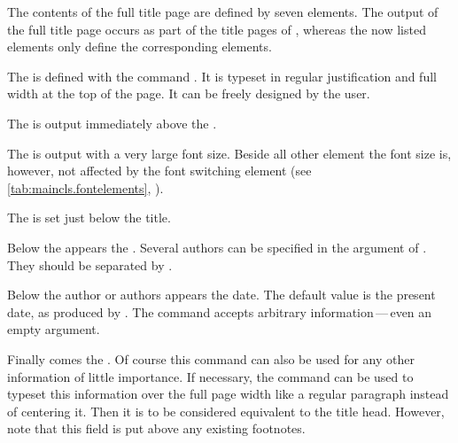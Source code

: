 \begin{Declaration}
\end{Declaration}%
The contents of the full title page are defined by seven elements. The output
of the full title page occurs as part of the title pages of ,
whereas the now listed elements only define the corresponding elements.

The 
 is defined with the command
. It is typeset in regular justification and full width at
the top of the page. It can be freely designed by the user.

The  is
output immediately above the .

The  is output with a very large font
size.  Beside all other element the font size is,
however, not affected by the font switching element  (see
\autoref{tab:maincls.fontelements},
).

The
 is set just below the title.

Below the  appears the
.  Several authors can be
specified in the argument of . They should be separated
by .

Below the author or authors appears the
date. The default value is the present date, as produced by
. The  command accepts arbitrary
information\,---\,even an empty argument.

Finally comes the
. Of course this command can also
be used for any other information of little importance. If necessary, the
 command can be used to typeset this information over the full
page width like a regular paragraph instead of centering it.  Then it is to be
considered equivalent to the title head. However, note that this field is put
above any existing footnotes.

